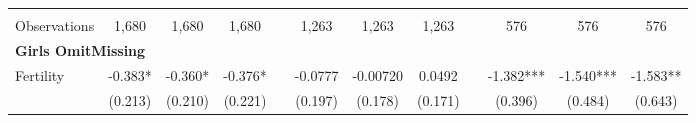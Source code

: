 \begin{landscape}
\begin{table}[htpb!]
\begin{center}
\begin{tabular}{lcccp{2mm}cccp{2mm}ccc}
\begin{footnotesize}\end{footnotesize}&\begin{footnotesize}\end{footnotesize}&\begin{footnotesize}\end{footnotesize}&\begin{footnotesize}\end{footnotesize}&\begin{footnotesize}\end{footnotesize}&\begin{footnotesize}\end{footnotesize}&\begin{footnotesize}\end{footnotesize}&\begin{footnotesize}\end{footnotesize}&\begin{footnotesize}\end{footnotesize}&\begin{footnotesize}\end{footnotesize}&\begin{footnotesize}\end{footnotesize}&\begin{footnotesize}\end{footnotesize}\\Observations&1,680&1,680&1,680&&1,263&1,263&1,263&&576&576&576\\
\multicolumn{12}{l}{\textbf{Girls OmitMissing}}\\ 
Fertility&-0.383*&-0.360*&-0.376*&&-0.0777&-0.00720&0.0492&&-1.382***&-1.540***&-1.583**\\
&(0.213)&(0.210)&(0.221)&&(0.197)&(0.178)&(0.171)&&(0.396)&(0.484)&(0.643)\\

\end{tabular}
\end{center}
\end{table}
\end{landscape}
